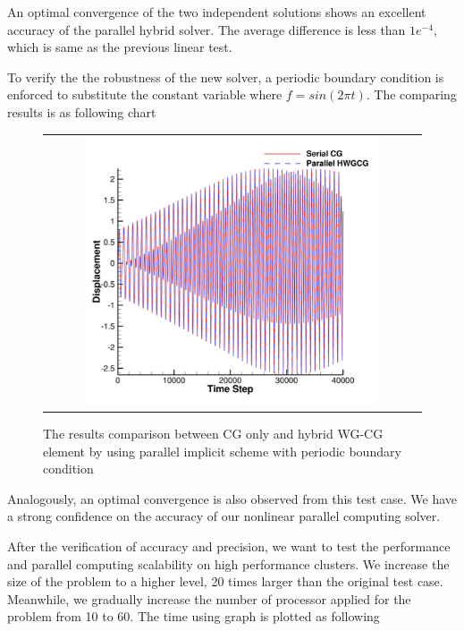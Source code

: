   An optimal convergence of the two independent solutions shows an excellent accuracy of the parallel hybrid solver. The average difference is less than $ 1e^{-4} $, which is same as the previous linear test.
  
  To verify the the robustness of the new solver, a periodic boundary condition is enforced to substitute the constant variable where $ f = sin (2 \pi t) $. The comparing results is as following chart
  
    \begin{figure}[H]
    	\centering
    	\begin{tabular}{c}
    		\includegraphics[width=0.8\textwidth]{./pics/result1d5.png}
    	\end{tabular}
    	\caption{\footnotesize The results comparison between CG only and hybrid WG-CG element by using parallel implicit scheme with periodic boundary condition}
    \end{figure}
    
    Analogously, an optimal convergence is also observed from this test case. We have a strong confidence on the accuracy of our nonlinear parallel computing solver. 
    
    After the verification of accuracy and precision, we want to test the performance and parallel computing scalability on high performance clusters. We increase the size of the problem to a higher level, 20 times larger than the original test case. Meanwhile, we gradually increase the number of processor applied for the problem from 10 to 60. The time using graph is plotted as following
    
